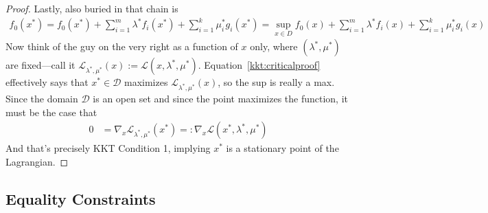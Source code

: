 \documentclass[12pt]{article}
\numberwithin{equation}{section} %
\theoremstyle{plain}
\theoremstyle{definition}
\theoremstyle{remark}
\newcommand{\sL}{\mathscr{L}}
\begin{document}
\begin{proof}
Lastly, also buried in that chain is
\begin{align}
  f_0(x^*)
  = f_0(x^*) + \sum^m_{i=1} \lambda^* f_i(x^*)
  + \sum^k_{i=1} \mu_i^* g_i(x^*)
  = \sup_{x\in D} f_0(x) + \sum^m_{i=1} \lambda^* f_i(x)
  + \sum^k_{i=1} \mu_i^* g_i(x)
  \label{kkt:criticalproof}
\end{align}
Now think of the guy on the very right as a function of $x$ only, where
$(\lambda^*,\mu^*)$ are fixed---call it
$\sL_{\lambda^*,\mu^*}(x):=\sL(x,\lambda^*,\mu^*)$.
Equation~\ref{kkt:criticalproof} effectively says that
$x^*\in\mathcal{D}$ maximizes $\sL_{\lambda^*,\mu^*}(x)$, so the sup is
really a max. Since the domain $\mathcal{D}$ is an open set and since
the point maximizes the function, it must be the case that
\begin{align*}
  0 &= \nabla_x \sL_{\lambda^*,\mu^*}(x^*)
  =:
  \nabla_x \sL(x^*,\lambda^*,\mu^*)
\end{align*}
And that's precisely KKT Condition 1, implying $x^*$ is a stationary
point of the Lagrangian.

\end{proof}


\subsection{Equality Constraints}
\end{document}
